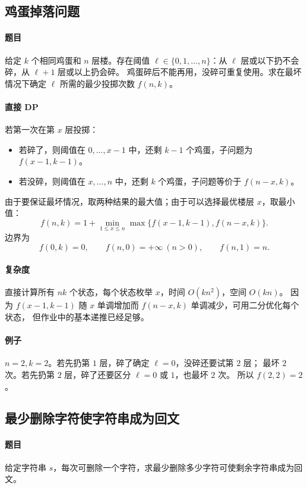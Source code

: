 \documentclass[UTF8,openany,12pt]{ctexbook}
\theoremstyle{remark}
\begin{document}
\subsection{鸡蛋掉落问题}

\paragraph{题目}
给定 $k$ 个相同鸡蛋和 $n$ 层楼。存在阈值
$\ell\in\{0,1,\dots,n\}$：从 $\ell$ 层或以下扔不会碎，从 $\ell+1$ 层或以上扔会碎。
鸡蛋碎后不能再用，没碎可重复使用。求在最坏情况下确定 $\ell$ 所需的最少投掷次数
$f(n,k)$。

\paragraph{直接 DP}
若第一次在第 $x$ 层投掷：
\begin{itemize}
  \item 若碎了，则阈值在 $0,\dots,x-1$ 中，还剩 $k-1$ 个鸡蛋，子问题为 $f(x-1,k-1)$。
  \item 若没碎，则阈值在 $x,\dots,n$ 中，还剩 $k$ 个鸡蛋，子问题等价于 $f(n-x,k)$。
\end{itemize}
由于要保证最坏情况，取两种结果的最大值；由于可以选择最优楼层 $x$，取最小值：
\[
  f(n,k)=1+\min_{1\le x\le n}\max\{f(x-1,k-1),f(n-x,k)\}.
\]
边界为
\[
  f(0,k)=0,\qquad f(n,0)=+\infty\ (n>0),\qquad f(n,1)=n.
\]

\paragraph{复杂度}
直接计算所有 $n k$ 个状态，每个状态枚举 $x$，时间 $O(kn^2)$，空间 $O(kn)$。
因为 $f(x-1,k-1)$ 随 $x$ 单调增加而 $f(n-x,k)$ 单调减少，可用二分优化每个状态，
但作业中的基本递推已经足够。

\paragraph{例子}
$n=2,k=2$。若先扔第 $1$ 层，碎了确定 $\ell=0$，没碎还要试第 $2$ 层；
最坏 $2$ 次。若先扔第 $2$ 层，碎了还要区分 $\ell=0$ 或 $1$，也最坏 $2$ 次。
所以 $f(2,2)=2$。

\subsection{最少删除字符使字符串成为回文}

\paragraph{题目}
给定字符串 $s$，每次可删除一个字符，求最少删除多少字符可使剩余字符串成为回文。
\end{document}
